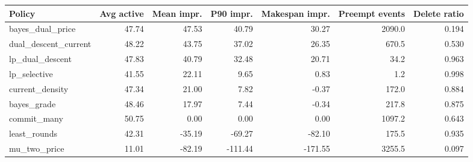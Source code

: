 \begin{tabular}{lrrrrrr}
\toprule
Policy & Avg active & Mean impr. & P90 impr. & Makespan impr. & Preempt events & Delete ratio \\
\midrule
bayes\_dual\_price & 47.74 & 47.53 & 40.79 & 30.27 & 2090.0 & 0.194 \\
dual\_descent\_current & 48.22 & 43.75 & 37.02 & 26.35 & 670.5 & 0.530 \\
lp\_dual\_descent & 47.83 & 40.79 & 32.48 & 20.71 & 34.2 & 0.963 \\
lp\_selective & 41.55 & 22.11 & 9.65 & 0.83 & 1.2 & 0.998 \\
current\_density & 47.34 & 21.00 & 7.82 & -0.37 & 172.0 & 0.884 \\
bayes\_grade & 48.46 & 17.97 & 7.44 & -0.34 & 217.8 & 0.875 \\
commit\_many & 50.75 & 0.00 & 0.00 & 0.00 & 1097.2 & 0.643 \\
least\_rounds & 42.31 & -35.19 & -69.27 & -82.10 & 175.5 & 0.935 \\
mu\_two\_price & 11.01 & -82.19 & -111.44 & -171.55 & 3255.5 & 0.097 \\
\bottomrule
\end{tabular}
